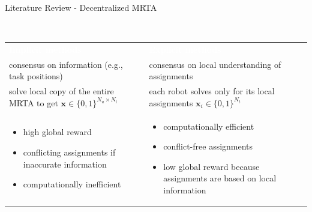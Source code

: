 \begin{frame}{Literature Review - Decentralized MRTA}
    \begin{block}{~\vspace{0.2cm}}
        \begin{center}
        \vspace{-1.0cm}
        \setcellgapes{3pt}\makegapedcells
        \begin{tabular}{>{\centering}p{}|>{\centering\arraybackslash}p{}}
         \textcolor{white}{\bfseries\boldmath Implicit methods~\cite{alighanbari2005decentralized, curtis2003simultaneous, samiei2023distributed}} & \textcolor{white}{\bfseries Explicit methods~\cite{arslan2007autonomous,choi2009consensus,johnson2017decentralized, shorinwa2023distributed, qu2019distributed}} \\
        consensus on information 
        (e.g., task positions) 
        & consensus on local understanding of assignments \\ 
        solve local copy of the entire MRTA to get $\mathbf{x}\in \{0,1\}^{N_u \times N_t}$&  each robot solves only for its local assignments $\mathbf{x}_i \in \{0,1\}^{N_t}$
        \\ \hline
        \begin{itemize}
            \item {\color{ao} high global reward}
            \item {\color{red}conflicting assignments if inaccurate information}
            \item {\color{red}computationally inefficient} 
        \end{itemize}
        &
        \begin{itemize}
            \item {\color{ao}computationally efficient}
            \item {\color{ao}conflict-free assignments}
            \item {\color{red} low global reward because assignments are based on local information}
        \end{itemize}
        
        \end{tabular}
        \end{center}
    \end{block}
\end{frame}

